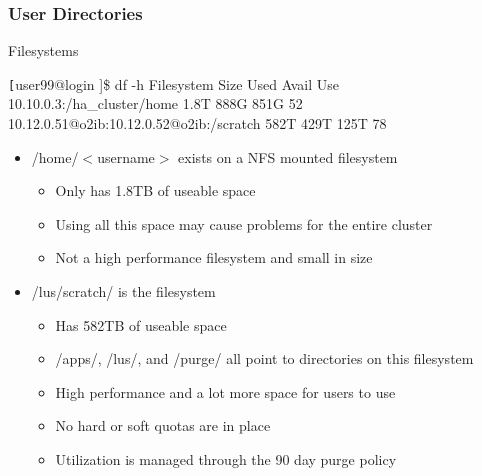 \begin{frame}[fragile]
\frametitle{User Directories}
\begin{block}{Filesystems}
\begin{semiverbatim}\tiny \texttt
[user99@login \ctilde]\$ df -h
Filesystem                                  Size  Used Avail Use%
10.10.0.3:/ha_cluster/home                  1.8T  888G  851G  52%
10.12.0.51@o2ib:10.12.0.52@o2ib:/scratch    582T  429T  125T  78%
\end{semiverbatim}
\end{block}
	\begin{itemize}\footnotesize
		\item /home/$<$username$>$ exists on a NFS mounted filesystem
		\begin{itemize}\tiny
			\item Only has 1.8TB of useable space
			\item Using all this space may cause problems for the entire cluster
			\item Not a high performance filesystem and small in size
		\end{itemize}
		\item /lus/scratch/ is the {\lustre} filesystem
		\begin{itemize}\tiny
			\item Has 582TB of useable space
			\item \ctilde{}/apps/, \ctilde{}/lus/, and \ctilde{}/purge/ all point to directories on this filesystem
			\item High performance and a lot more space for users to use
			\item No hard or soft quotas are in place
			\item Utilization is managed through the 90 day purge policy
		\end{itemize}
	\end{itemize}
\end{frame}


